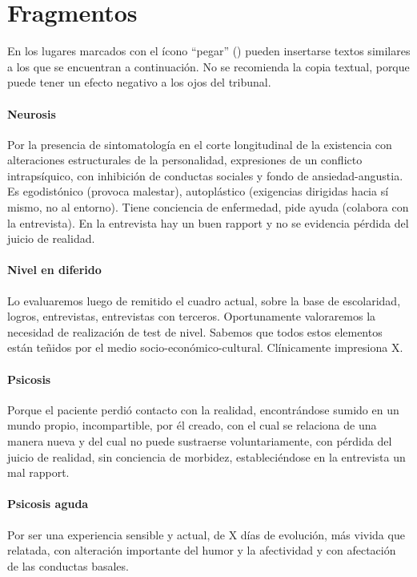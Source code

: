 \section*{Fragmentos}
En los lugares marcados con el ícono ``pegar'' (\faPaste) pueden insertarse textos similares a los que se encuentran a continuación. No se recomienda la copia textual, porque puede tener un efecto negativo a los ojos del tribunal.

\paragraph{Neurosis}
\faCut Por la presencia de sintomatología en el corte longitudinal de la existencia con alteraciones estructurales de la personalidad, expresiones de un conflicto intrapsíquico, con inhibición de conductas sociales y fondo de ansiedad-angustia. Es egodistónico (provoca malestar), autoplástico (exigencias dirigidas hacia sí mismo, no al entorno). Tiene conciencia de enfermedad, pide ayuda (colabora con la entrevista). En la entrevista hay un buen rapport y no se evidencia pérdida del juicio de realidad.

\paragraph{Nivel en diferido}
\faCut Lo evaluaremos luego de remitido el cuadro actual, sobre la base de escolaridad, logros, entrevistas, entrevistas con terceros. Oportunamente valoraremos la necesidad de realización de test de nivel. Sabemos que todos estos elementos están teñidos por el medio socio-económico-cultural. Clínicamente impresiona X.

\paragraph{Psicosis}
\faCut Porque el paciente perdió contacto con la realidad, encontrándose sumido en un mundo propio, incompartible, por él creado, con el cual se relaciona de una manera nueva y del cual no puede sustraerse voluntariamente, con pérdida del juicio de realidad, sin conciencia de morbidez, estableciéndose en la entrevista un mal rapport.

\paragraph{Psicosis aguda}
\faCut Por ser una experiencia sensible y actual, de X días de evolución, más vivida que relatada, con alteración importante del humor y la afectividad y con afectación de las conductas basales.
